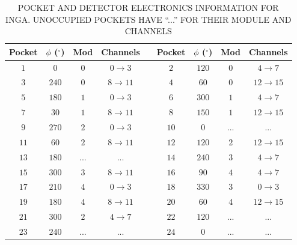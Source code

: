 \begin{table}
\caption{POCKET AND DETECTOR ELECTRONICS INFORMATION FOR INGA. UNOCCUPIED POCKETS HAVE ``...'' FOR THEIR MODULE AND CHANNELS\label{tbl:app2-inga-detectors}}
\begin{center}
\begin{tabular}{|c|c|c|c|c|c|c|c|c|}
\hline
\hline
Pocket & $\phi$ ($^{\circ}$) & Mod & Channels & & Pocket & $\phi$ ($^{\circ}$) & Mod & Channels\\

\hline{}  $1$&  $0$&$0$& $0\rightarrow{}3$ &  & $2$&$120$&$0$& $4\rightarrow{}7$\\
\hline{}  $3$&$240$&$0$& $8\rightarrow{}11$&  & $4$& $60$&$0$&$12\rightarrow{}15$\\

\hline{}  $5$&$180$&$1$& $0\rightarrow{}3$ &  & $6$&$300$&$1$& $4\rightarrow{}7$\\
\hline{}  $7$& $30$&$1$& $8\rightarrow{}11$&  & $8$&$150$&$1$&$12\rightarrow{}15$\\

\hline{}  $9$&$270$&$2$& $0\rightarrow{}3$ &  &$10$&  $0$&...&...\\
\hline{} $11$& $60$&$2$& $8\rightarrow{}11$&  &$12$&$120$&$2$&$12\rightarrow{}15$\\

\hline{} $13$&$180$&...&        ...        &  &$14$&$240$&$3$& $4\rightarrow{}7$\\
\hline{} $15$&$300$&$3$& $8\rightarrow{}11$&  &$16$& $90$&$4$& $4\rightarrow{}7$\\
\hline{} $17$&$210$&$4$& $0\rightarrow{}3$ &  &$18$&$330$&$3$& $0\rightarrow{}3$\\
\hline{} $19$&$180$&$4$& $8\rightarrow{}11$&  &$20$& $60$&$4$&$12\rightarrow{}15$\\
\hline{} $21$&$300$&$2$& $4\rightarrow{}7$ &  &$22$&$120$&...&...\\
\hline{} $23$&$240$&...&        ...        &  &$24$&  $0$&...&...\\
\hline
\hline
\end{tabular}
\end{center}
\end{table}
